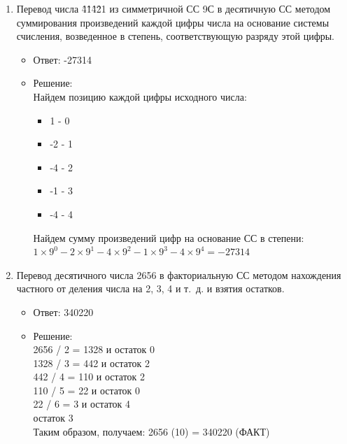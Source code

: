 \documentclass[14pt,final,oneside]{extreport}%
\begin{document}
\begin{enumerate}
        \item Перевод числа {\^4}{\^1}{\^4}{\^2}1 из симметричной СС 9С в десятичную СС методом суммирования произведений каждой цифры числа на основание системы счисления, возведенное в степень, соответствующую разряду этой цифры.
        \begin{itemize}
            \item Ответ: -27314
            \item Решение: \\
            Найдем позицию каждой цифры исходного числа:
            \begin{itemize}
                \item 1 - 0
                \item -2 - 1
                \item -4 - 2
                \item -1 - 3
                \item -4 - 4
            \end{itemize}
            Найдем сумму произведений цифр на основание СС в степени: \\
            \( 1 \times 9^0 -2 \times 9^1 -4 \times 9^2 -1 \times 9^3 - 4 \times 9^4 = -27314 \)
        \end{itemize}

        \item Перевод десятичного числа 2656 в факториальную СС методом нахождения частного от деления числа на 2, 3, 4 и т. д. и взятия остатков.
        \begin{itemize}
            \item Ответ: 340220
            \item Решение: \\
                2656 / 2 = 1328 и остаток 0 \\
                1328 / 3 = 442 и остаток 2 \\
                442 / 4 = 110 и остаток 2 \\
                110 / 5 = 22 и остаток 0 \\
                22 / 6 = 3 и остаток 4 \\
                остаток 3 \\

                Таким образом, получаем: 2656 (10) = 340220 (ФАКТ)
        \end{itemize}

    \end{enumerate}
\end{document}
